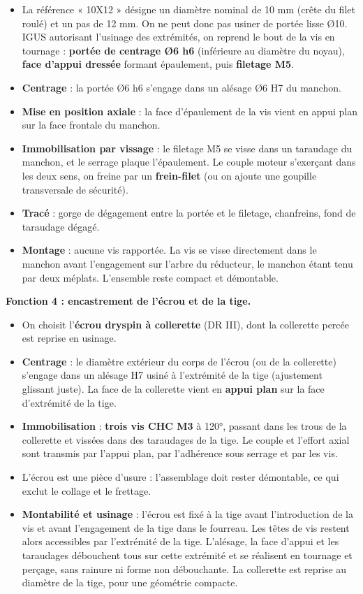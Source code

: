 \documentclass[11pt,a4paper]{article}
\providecommand{\tightlist}{\setlength{\itemsep}{0pt}\setlength{\parskip}{0pt}}
\begin{document}
\begin{itemize}
\tightlist
\item
  La référence « 10X12 » désigne un diamètre nominal de 10 mm (crête du filet roulé) et un pas de 12 mm. On ne peut donc pas usiner de portée lisse Ø10. IGUS autorisant l'usinage des extrémités, on reprend le bout de la vis en tournage : \textbf{portée de centrage Ø6 h6} (inférieure au diamètre du noyau), \textbf{face d'appui dressée} formant épaulement, puis \textbf{filetage M5}.
\item
  \textbf{Centrage} : la portée Ø6 h6 s'engage dans un alésage Ø6 H7 du manchon.
\item
  \textbf{Mise en position axiale} : la face d'épaulement de la vis vient en appui plan sur la face frontale du manchon.
\item
  \textbf{Immobilisation par vissage} : le filetage M5 se visse dans un taraudage du manchon, et le serrage plaque l'épaulement. Le couple moteur s'exerçant dans les deux sens, on freine par un \textbf{frein-filet} (ou on ajoute une goupille transversale de sécurité).
\item
  \textbf{Tracé} : gorge de dégagement entre la portée et le filetage, chanfreins, fond de taraudage dégagé.
\item
  \textbf{Montage} : aucune vis rapportée. La vis se visse directement dans le manchon avant l'engagement sur l'arbre du réducteur, le manchon étant tenu par deux méplats. L'ensemble reste compact et démontable.
\end{itemize}

\textbf{Fonction 4 : encastrement de l'écrou et de la tige.}

\begin{itemize}
\tightlist
\item
  On choisit l'\textbf{écrou dryspin à collerette} (DR III), dont la collerette percée est reprise en usinage.
\item
  \textbf{Centrage} : le diamètre extérieur du corps de l'écrou (ou de la collerette) s'engage dans un alésage H7 usiné à l'extrémité de la tige (ajustement glissant juste). La face de la collerette vient en \textbf{appui plan} sur la face d'extrémité de la tige.
\item
  \textbf{Immobilisation} : \textbf{trois vis CHC M3} à 120°, passant dans les trous de la collerette et vissées dans des taraudages de la tige. Le couple et l'effort axial sont transmis par l'appui plan, par l'adhérence sous serrage et par les vis.
\item
  L'écrou est une pièce d'usure : l'assemblage doit rester démontable, ce qui exclut le collage et le frettage.
\item
  \textbf{Montabilité et usinage} : l'écrou est fixé à la tige avant l'introduction de la vis et avant l'engagement de la tige dans le fourreau. Les têtes de vis restent alors accessibles par l'extrémité de la tige. L'alésage, la face d'appui et les taraudages débouchent tous sur cette extrémité et se réalisent en tournage et perçage, sans rainure ni forme non débouchante. La collerette est reprise au diamètre de la tige, pour une géométrie compacte.
\end{itemize}
\end{document}
